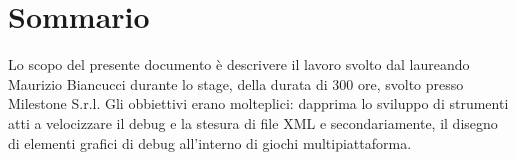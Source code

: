 
\cleardoublepage
{}
{}
\begingroup
\let\clearpage\relax
\let\cleardoublepage\relax
\let\cleardoublepage\relax

\chapter*{Sommario}

Lo scopo del presente documento è descrivere il lavoro svolto dal laureando Maurizio Biancucci durante lo stage, della durata di 300 ore, svolto presso Milestone S.r.l.
Gli obbiettivi erano molteplici: dapprima lo sviluppo di strumenti atti a velocizzare il debug e la stesura di file XML e secondariamente, il disegno di elementi grafici di debug all'interno di giochi multipiattaforma.

%
%

\endgroup			

\vfill

